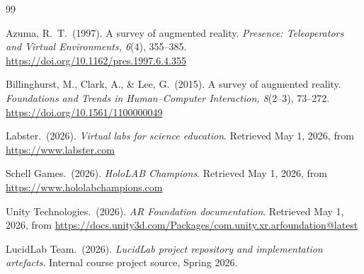 \documentclass[12pt,a4paper]{article}
\begin{document}
\begin{thebibliography}{99}

Azuma, R.\ T.\ (1997).
A survey of augmented reality.
\textit{Presence: Teleoperators and Virtual Environments, 6}(4), 355--385.
\url{https://doi.org/10.1162/pres.1997.6.4.355}

Billinghurst, M., Clark, A., \& Lee, G.\ (2015).
A survey of augmented reality.
\textit{Foundations and Trends in Human--Computer Interaction, 8}(2--3), 73--272.
\url{https://doi.org/10.1561/1100000049}

Labster.\ (2026).
\textit{Virtual labs for science education}.
Retrieved May 1, 2026, from \url{https://www.labster.com}

Schell Games.\ (2026).
\textit{HoloLAB Champions}.
Retrieved May 1, 2026, from \url{https://www.hololabchampions.com}

Unity Technologies.\ (2026).
\textit{AR Foundation documentation}.
Retrieved May 1, 2026, from
\url{https://docs.unity3d.com/Packages/com.unity.xr.arfoundation@latest}

LucidLab Team.\ (2026).
\textit{LucidLab project repository and implementation artefacts}.
Internal course project source, Spring 2026.

\end{thebibliography}
\end{document}
